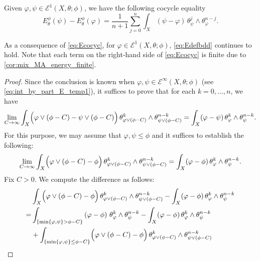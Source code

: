 \begin{proposition}\label{prop:cocycE1}
    Given $\varphi,\psi\in \mathcal{E}^1(X,\theta;\phi)$, we have the following cocycle equality
    \begin{equation}\label{eq:Ecocyc}
        E^{\phi}_{\theta}(\psi)-E^{\phi}_{\theta}(\varphi)=\frac{1}{n+1}\sum_{j=0}^n \int_X (\psi-\varphi)\, \theta_{\psi}^j\wedge \theta_{\varphi}^{n-j}.
    \end{equation}
\end{proposition}
As a consequence of \eqref{eq:Ecocyc}, for $\varphi\in \mathcal{E}^1(X,\theta;\phi)$, \eqref{eq:Edefbdd} continues to hold. Note that each term on the right-hand side of \eqref{eq:Ecocyc} is finite due to \cref{cor:mix_MA_energy_finite}.
\begin{proof}
    Since the conclusion is known when $\varphi,\psi\in \mathcal{E}^{\infty}(X,\theta;\phi)$ (see \eqref{eq:int_by_part_E_temp1}), it suffices to prove that for each $k=0,\ldots,n$, we have
    \begin{equation}\label{eq:canonic_app_energy_conv}
    \lim_{C\to\infty} \int_X \Bigl( \varphi\lor (\phi-C)-\psi\lor (\phi-C) \Bigr) \,\theta_{\varphi\lor (\phi-C)}^k\wedge \theta_{\psi\lor (\phi-C)}^{n-k}=\int_X (\varphi-\psi)\,\theta_{\varphi}^k\wedge \theta_{\psi}^{n-k}.
    \end{equation}
    For this purpose, we may assume that $\varphi,\psi\leq \phi$ and it suffices to establish the following:
    \begin{equation}\label{eq:intvarphilorphimCmphi_temp1}
        \lim_{C\to\infty} \int_X \Bigl( \varphi\lor (\phi-C)-\phi \Bigr) \,\theta_{\varphi\lor (\phi-C)}^k\wedge \theta_{\psi\lor (\phi-C)}^{n-k}=\int_X (\varphi-\phi)\,\theta_{\varphi}^k\wedge \theta_{\psi}^{n-k}.
    \end{equation}
    Fix $C>0$. We compute the difference as follows:
    \[
    \begin{aligned}
    &\int_X \Bigl( \varphi\lor (\phi-C)-\phi \Bigr) \,\theta_{\varphi\lor (\phi-C)}^k\wedge \theta_{\psi\lor (\phi-C)}^{n-k}-\int_X (\varphi-\phi)\,\theta_{\varphi}^k\wedge \theta_{\psi}^{n-k}\\
    =& \int_{\{\min\{\varphi,\psi\}>\phi-C\}}\left( \varphi-\phi \right) \,\theta_{\varphi}^k\wedge \theta_{\psi}^{n-k}-\int_X (\varphi-\phi)\,\theta_{\varphi}^k\wedge \theta_{\psi}^{n-k}\\
    &+\int_{\{\min\{\varphi,\psi\}\leq \phi-C\}}\Bigl( \varphi\lor (\phi-C)-\phi \Bigr) \,\theta_{\varphi\lor (\phi-C)}^k\wedge \theta_{\psi\lor (\phi-C)}^{n-k}\\

\end{aligned}\]
\end{proof}
